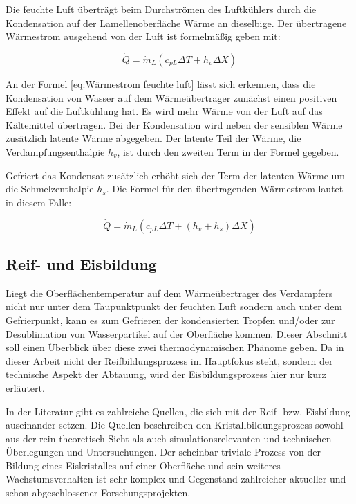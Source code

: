 Die feuchte Luft überträgt beim Durchströmen des Luftkühlers durch die Kondensation auf der Lamellenoberfläche Wärme an dieselbige. Der übertragene Wärmestrom ausgehend von der Luft ist formelmäßig geben mit: 

\begin{equation}
\dot{Q}= \dot{m}_L (c_{pL}\Delta T + h_v \Delta X)
\label{eq:Wärmestrom feuchte luft}
\end{equation}

An der Formel \ref{eq:Wärmestrom feuchte luft} lässt sich erkennen, dass die Kondensation von Wasser auf dem Wärmeübertrager zunächst einen positiven Effekt auf die Luftkühlung hat. Es wird mehr Wärme von der Luft auf das Kältemittel übertragen. Bei der Kondensation wird neben der sensiblen Wärme zusätzlich latente Wärme abgegeben. Der latente Teil der Wärme, die Verdampfungsenthalpie $h_v$, ist durch den zweiten Term in der Formel gegeben. 

Gefriert das Kondensat zusätzlich erhöht sich der Term der latenten Wärme um die Schmelzenthalpie $h_s$. Die Formel für den übertragenden Wärmestrom lautet in diesem Falle: 

\begin{equation}
\dot{Q}= \dot{m}_L (c_{pL}\Delta T + (h_v+ h_s) \Delta X)
\label{eq:Wärmestrom Reif}
\end{equation}

\citep{Grote2014}
\citep{Baehr2013}

\subsection{Reif- und Eisbildung}
\label{subsec:Reifbildung}

Liegt die Oberflächentemperatur auf dem Wärmeübertrager des Verdampfers nicht nur unter dem Taupunktpunkt der feuchten Luft sondern auch unter dem Gefrierpunkt, kann es zum Gefrieren der kondensierten Tropfen und/oder zur Desublimation von Wasserpartikel auf der Oberfläche kommen. Dieser Abschnitt soll einen Überblick über diese zwei thermodynamischen Phänome geben. Da in dieser Arbeit nicht der Reifbildungsprozess im Hauptfokus steht, sondern  der technische Aspekt der Abtauung, wird der Eisbildungsprozess hier nur kurz erläutert.

In der Literatur gibt es zahlreiche Quellen, die sich mit der Reif- bzw. Eisbildung auseinander setzen. Die Quellen beschreiben den Kristallbildungsprozess sowohl aus der rein theoretisch Sicht als auch simulationsrelevanten und technischen Überlegungen und Untersuchungen. Der scheinbar triviale Prozess von der Bildung eines Eiskristalles auf einer Oberfläche und sein weiteres Wachstumsverhalten ist sehr komplex und Gegenstand zahlreicher aktueller und schon abgeschlossener Forschungsprojekten.

